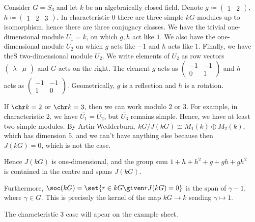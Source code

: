 Consider $G = S_3$ and let $k$ be an algebraically closed field. Denote
$g \coloneqq \begin{pmatrix}1&2\end{pmatrix}$, $h \coloneqq \begin{pmatrix}1&2&3\end{pmatrix}$.
In characteristic $0$ there are three simple $kG$-modules up to isomorphism, hence
there are three conjugacy classes. We have the trivial one-dimensional module
$U_1 = k$, on which $g, h$ act like $1$. We also have the one-dimensional module
$U_2$ on which $g$ acts like $-1$ and $h$ acts like $1$. Finally, we have theS
two-dimensional module $U_2$. We write elements of $U_2$ as row vectors
$\begin{pmatrix}\lambda&\mu\end{pmatrix}$ and $G$ acts on the right.  The element
$g$ acts as $\begin{pmatrix}-1&-1\\0&1\end{pmatrix}$ and $h$ acts as
$\begin{pmatrix}-1&-1\\1&0\end{pmatrix}$. Geometrically, $g$ is a reflection and
$h$ is a rotation.

If $\chr k = 2$ or $\chr k = 3$, then we can work modulo $2$ or $3$. For example,
in characteristic $2$, we have $\overline{U_1} = \overline{U_2}$, but $\overline{U_3}$
remains simple. Hence, we have at least two simple modules. By Artin-Wedderburn,
$kG/J(kG) \cong M_1(k)\oplus M_2(k)$, which has dimension $5$, and we can't have
anything else because then $J(kG) = 0$, which is not the case.

Hence $J(kG)$ is one-dimensional, and the group sum $1 + h + h^2 + g + gh + gh^2$ is
contained in the centre and spans $J(kG)$.

Furthermore, $\soc(kG) = \set{r \in kG\given rJ(kG) = 0}$ is the span of $\gamma  - 1$,
where $\gamma \in G$. This is precisely the kernel of the map $kG\to k$ sending
$\gamma\mapsto 1$.

The characteristic $3$ case will apear on the example sheet.
